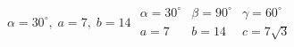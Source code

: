 { $\alpha = 30^{\circ}, \; a = 7, \; b = 14$}
{$\begin{array}{lll}\alpha = 30^{\circ} & \beta = 90^{\circ} & \gamma = 60^{\circ} \\a = 7 & b = 14 & c = 7\sqrt{3} \end{array}$}
